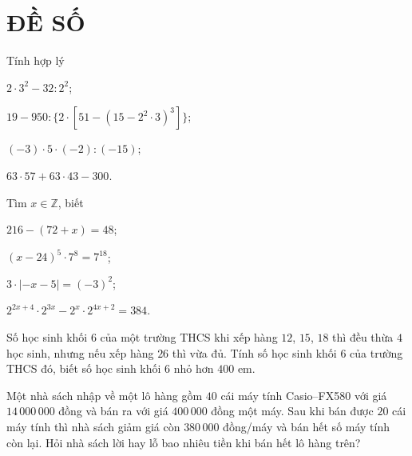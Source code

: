 \section{ĐỀ SỐ \thesection } %
\setcounter{bt}{0}

\begin{bt} Tính hợp lý
	\begin{listEX}[2]
		\item $2\cdot 3^{2}-32:2^{2}$;
		\item $19 - 950 : \{ 2 \cdot [ 51 - (15 - 2^{2} \cdot 3)^{3} ] \}$;
		\item $(-3)\cdot 5\cdot (-2):(-15)$;
		\item $63\cdot 57+63\cdot 43-300$.
	\end{listEX}
\end{bt}

\begin{bt}  Tìm $x \in \mathbb{Z}$, biết
	\begin{listEX}[2]
		\item $216-(72+x)=48$;
		\item $(x-24)^{5}\cdot 7^{8}=7^{18}$;
		\item $3\cdot\left|-x-5\right|=(-3)^{2}$;
		\item $2^{2x+4}\cdot 2^{3x}-2^{x}\cdot 2^{4x+2}=384$.
	\end{listEX}
\end{bt}

\begin{bt}  Số học sinh khối $6$ của một trường THCS khi xếp hàng $12$, $15$, $18$ thì đều thừa $4$ học sinh, nhưng nếu xếp hàng $26$ thì vừa đủ. Tính số học sinh khối $6$ của trường THCS đó, biết số học sinh khối $6$ nhỏ hơn $400$ em.
\end{bt}

\begin{bt} 
	Một nhà sách nhập về một lô hàng gồm $40$ cái máy tính Casio–FX580 với giá $14\,000\,000$ đồng và bán ra với giá $400\,000$ đồng một máy. Sau khi bán được $20$ cái máy tính thì nhà sách giảm giá còn $380\,000$ đồng/máy và bán hết số máy tính còn lại. Hỏi nhà sách lời hay lỗ bao nhiêu tiền khi bán hết lô hàng trên?
\end{bt}

